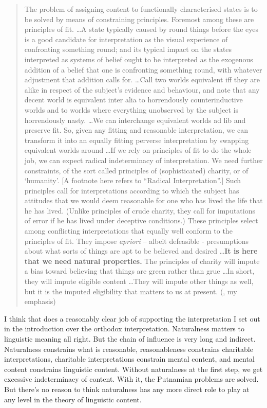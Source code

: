 \documentclass[
  10pt,
  letterpaper,
  DIV=11,
  numbers=noendperiod,
  twoside]{scrartcl}
\begin{document}
\begin{quote}
The problem of assigning content to functionally characterised states is
to be solved by means of constraining principles. Foremost among these
are principles of fit. \ldots A state typically caused by round things
before the eyes is a good candidate for interpretation as the visual
experience of confronting something round; and its typical impact on the
states interpreted as systems of belief ought to be interpreted as the
exogenous addition of a belief that one is confronting something round,
with whatever adjustment that addition calls for. \ldots Call two worlds
equivalent iff they are alike in respect of the subject's evidence and
behaviour, and note that any decent world is equivalent inter alia to
horrendously counterinductive worlds and to worlds where everything
unobserved by the subject is horrendously nasty. \ldots We can
interchange equivalent worlds ad lib and preserve fit. So, given any
fitting and reasonable interpretation, we can transform it into an
equally fitting perverse interpretation by swapping equivalent worlds
around \ldots If we rely on principles of fit to do the whole job, we
can expect radical indeterminacy of interpretation. We need further
constraints, of the sort called principles of (sophisticated) charity,
or of `humanity'. {[}A footnote here refers to ``Radical
Interpretation''.{]} Such principles call for interpretations according
to which the subject has attitudes that we would deem reasonable for one
who has lived the life that he has lived. (Unlike principles of crude
charity, they call for imputations of error if he has lived under
deceptive conditions.) These principles select among conflicting
interpretations that equally well conform to the principles of fit. They
impose \emph{apriori} -- albeit defeasible - presumptions about what
sorts of things are apt to be believed and desired \ldots{}\textbf{It is
here that we need natural properties.} The principles of charity will
impute a bias toward believing that things are green rather than grue
\ldots In short, they will impute eligible content \ldots They will
impute other things as well, but it is the imputed eligibility that
matters to us at present. (, my emphasis)
\end{quote}

I think that does a reasonably clear job of supporting the
interpretation I set out in the introduction over the orthodox
interpretation. Naturalness matters to linguistic meaning all right. But
the chain of influence is very long and indirect. Naturalness constrains
what is reasonable, reasonableness constrains charitable
interpretations, charitable interpretations constrain mental content,
and mental content constrains linguistic content. Without naturalness at
the first step, we get excessive indeterminacy of content. With it, the
Putnamian problems are solved. But there's no reason to think
naturalness has any more direct role to play at any level in the theory
of linguistic content.
\end{document}

